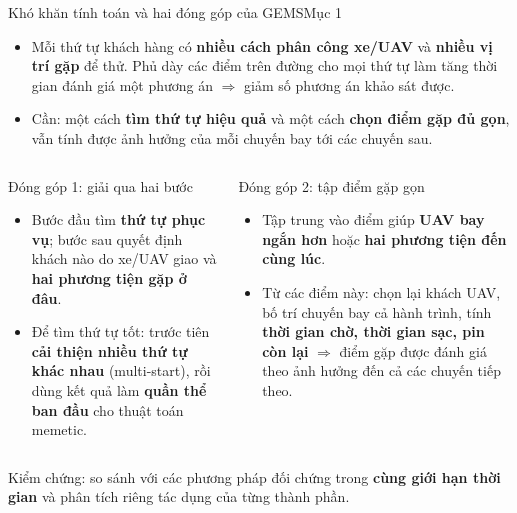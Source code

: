 \documentclass[aspectratio=169,10pt,t,xcolor={table}]{beamer}
\newcommand{\src}[1]{\hfill{\normalfont\footnotesize\color{white!62!navy}#1}}  %
\begin{document}
\begin{frame}{Khó khăn tính toán và hai đóng góp của GEMS\src{Mục 1}}
\begin{itemize}\small
\item Mỗi thứ tự khách hàng có \textbf{nhiều cách phân công xe/UAV} và \textbf{nhiều vị trí gặp} để thử.
      Phủ dày các điểm trên đường cho mọi thứ tự làm tăng thời gian đánh giá một phương án $\Rightarrow$ giảm số phương án khảo sát được.
\item Cần: một cách \textbf{tìm thứ tự hiệu quả} và một cách \textbf{chọn điểm gặp đủ gọn}, vẫn tính được ảnh hưởng của mỗi chuyến bay tới các chuyến sau.
\end{itemize}
\vspace{2pt}
\begin{columns}[T,onlytextwidth]
\begin{block}{Đóng góp 1: giải qua hai bước}
\footnotesize
\begin{itemize}
\item Bước đầu tìm \textbf{thứ tự phục vụ}; bước sau quyết định khách nào do xe/UAV giao và \textbf{hai phương tiện gặp ở đâu}.
\item Để tìm thứ tự tốt: trước tiên \textbf{cải thiện nhiều thứ tự khác nhau} (multi-start), rồi dùng kết quả làm \textbf{quần thể ban đầu} cho thuật toán memetic.
\end{itemize}
\end{block}
\begin{block}{Đóng góp 2: tập điểm gặp gọn}
\footnotesize
\begin{itemize}
\item Tập trung vào điểm giúp \textbf{UAV bay ngắn hơn} hoặc \textbf{hai phương tiện đến cùng lúc}.
\item Từ các điểm này: chọn lại khách UAV, bố trí chuyến bay cả hành trình, tính \textbf{thời gian chờ, thời gian sạc, pin còn lại} $\Rightarrow$ điểm gặp được đánh giá theo ảnh hưởng đến cả các chuyến tiếp theo.
\end{itemize}
\end{block}
\end{columns}
\vspace{3pt}
{\footnotesize Kiểm chứng: so sánh với các phương pháp đối chứng trong \textbf{cùng giới hạn thời gian} và phân tích riêng tác dụng của từng thành phần.}
\end{frame}
\end{document}
